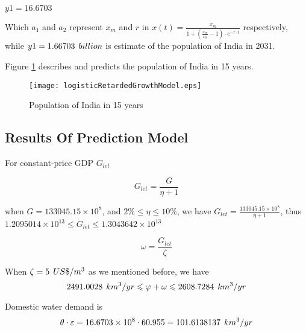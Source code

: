 \documentclass[tcn = 45538, sheet = true, abstract = true]{mcmthesis}
\begin{document}
$y1 = 16.6703$

Which $a_{1}$ and $a_{2}$ represent $x_{m}$ and $r$
in $x(t) = \frac{x_{m}}{1+(\frac{x_{m}}{x_{0}}-1) \cdot e^{-r \cdot t}}$
respectively, 
while $y1 = 1.66703\hspace{1 ex} billion$ is estimate of the population of India in 2031.

Figure \ref{fig:populationOfIndiaIn15Years} describes and predicts the population of India in 15 years.

\begin{figure}[]
\small
\centering
\texttt{[image: logisticRetardedGrowthModel.eps]}
\caption{Population of India in 15 years} \label{fig:populationOfIndiaIn15Years}
\end{figure}

\subsection{Results Of Prediction Model}

\hspace{1.5 em} For constant-price GDP $G_{let}$

\begin{Lemma}
\begin{equation}
G_{let} = \frac{G}{\eta + 1}
\end{equation}
\end{Lemma}

when $G = 133045.15 \times 10^8$, 
and $2\% \leqslant \eta \leqslant 10\%$, 
we have $G_{let} = \frac{133045.15 \times 10^8}{\eta +1}$, 
thus $1.2095014 \times 10^{13} \leqslant G_{let} \leqslant 1.3043642 \times 10^{13}$

\begin{Lemma}
\begin{equation}
\omega = \frac{G_{let}}{\zeta}
\end{equation}
\end{Lemma}

When $\zeta = 5\hspace{1 ex} US\$ / m^3$ as we mentioned before, 
we have 
\begin{equation}
2491.0028\hspace{1 ex} km^3/yr \leqslant \varphi + \omega \leqslant 2608.7284\hspace{1 ex} km^3/yr
\end{equation}


Domestic water demand is
\begin{equation}
\theta \cdot \varepsilon = 16.6703 \times 10^8 \cdot 60.955 = 101.6138137\hspace{1 ex} km^3/yr
\end{equation}
\end{document}
